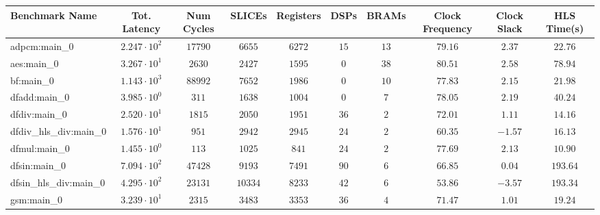 \begin{tabular}{|l|c|c|c|c|c|c|c|c|c|}
\hline
Benchmark Name          & Tot. Latency           & Num Cycles & SLICEs    & Registers & DSPs    & BRAMs   & Clock Frequency & Clock Slack & HLS Time(s) \\
\hline
adpcm:main\_0           & $ 2.247 \cdot 10^{2} $ & $ 17790  $ & $ 6655  $ & $ 6272  $ & $ 15  $ & $ 13  $ & $ 79.16       $ & $ 2.37    $ & $ 22.76   $ \\
aes:main\_0             & $ 3.267 \cdot 10^{1} $ & $ 2630   $ & $ 2427  $ & $ 1595  $ & $ 0   $ & $ 38  $ & $ 80.51       $ & $ 2.58    $ & $ 78.94   $ \\
bf:main\_0              & $ 1.143 \cdot 10^{3} $ & $ 88992  $ & $ 7652  $ & $ 1986  $ & $ 0   $ & $ 10  $ & $ 77.83       $ & $ 2.15    $ & $ 21.98   $ \\
dfadd:main\_0           & $ 3.985 \cdot 10^{0} $ & $ 311    $ & $ 1638  $ & $ 1004  $ & $ 0   $ & $ 7   $ & $ 78.05       $ & $ 2.19    $ & $ 40.24   $ \\
dfdiv:main\_0           & $ 2.520 \cdot 10^{1} $ & $ 1815   $ & $ 2050  $ & $ 1951  $ & $ 36  $ & $ 2   $ & $ 72.01       $ & $ 1.11    $ & $ 14.16   $ \\
dfdiv\_hls\_div:main\_0 & $ 1.576 \cdot 10^{1} $ & $ 951    $ & $ 2942  $ & $ 2945  $ & $ 24  $ & $ 2   $ & $ 60.35       $ & $ -1.57   $ & $ 16.13   $ \\
dfmul:main\_0           & $ 1.455 \cdot 10^{0} $ & $ 113    $ & $ 1025  $ & $ 841   $ & $ 24  $ & $ 2   $ & $ 77.69       $ & $ 2.13    $ & $ 10.90   $ \\
dfsin:main\_0           & $ 7.094 \cdot 10^{2} $ & $ 47428  $ & $ 9193  $ & $ 7491  $ & $ 90  $ & $ 6   $ & $ 66.85       $ & $ 0.04    $ & $ 193.64  $ \\
dfsin\_hls\_div:main\_0 & $ 4.295 \cdot 10^{2} $ & $ 23131  $ & $ 10334 $ & $ 8233  $ & $ 42  $ & $ 6   $ & $ 53.86       $ & $ -3.57   $ & $ 193.34  $ \\
gsm:main\_0             & $ 3.239 \cdot 10^{1} $ & $ 2315   $ & $ 3483  $ & $ 3353  $ & $ 36  $ & $ 4   $ & $ 71.47       $ & $ 1.01    $ & $ 19.24   $ \\

\end{tabular}

